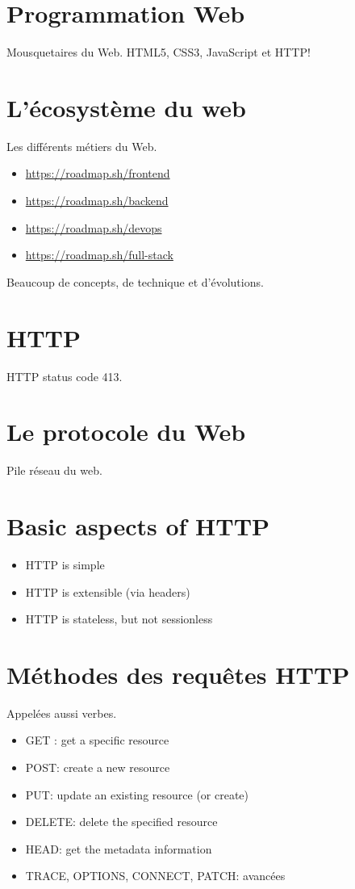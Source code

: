 \documentclass{article}
\begin{document}
\section{Programmation Web}
Mousquetaires du Web. HTML5, CSS3, JavaScript et HTTP!

\section{L’écosystème du web}
Les différents métiers du Web.
\begin{itemize}
    \item \url{https://roadmap.sh/frontend}
    \item \url{https://roadmap.sh/backend}
    \item \url{https://roadmap.sh/devops}
    \item \url{https://roadmap.sh/full-stack}
\end{itemize}
Beaucoup de concepts, de technique et d’évolutions.

\section{HTTP}
HTTP status code 413.

\section{Le protocole du Web}
Pile réseau du web.

\section{Basic aspects of HTTP}
\begin{itemize}
    \item HTTP is simple
    \item HTTP is extensible (via headers)
    \item HTTP is stateless, but not sessionless
\end{itemize}

\section{Méthodes des requêtes HTTP}
Appelées aussi verbes.
\begin{itemize}
    \item GET : get a specific resource
    \item POST: create a new resource
    \item PUT: update an existing resource (or create)
    \item DELETE: delete the specified resource
    \item HEAD: get the metadata information
    \item TRACE, OPTIONS, CONNECT, PATCH: avancées
\end{itemize}
\end{document}

